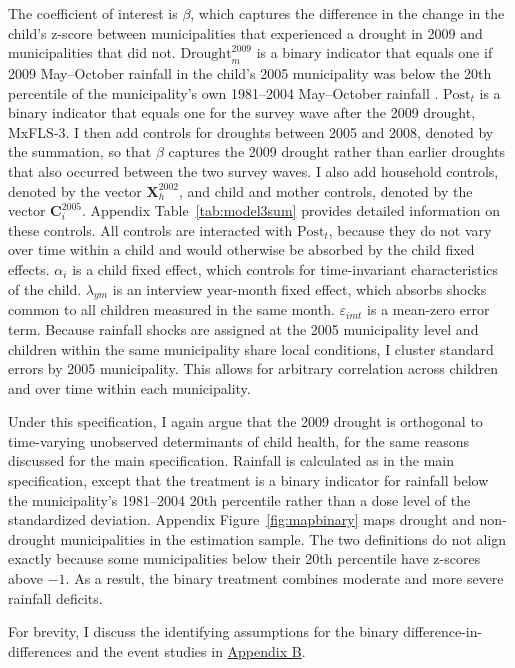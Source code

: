 \documentclass[12pt]{article}
\begin{document}
The coefficient of interest is $\beta$, which captures the difference in the change in the child's z-score between municipalities that experienced a drought in 2009 and municipalities that did not. $\text{Drought}_m^{2009}$ is a binary indicator that equals one if 2009 May--October rainfall in the child's 2005 municipality was below the 20th percentile of the municipality's own 1981--2004 May--October rainfall \parencite{shahDroughtOpportunitiesContemporaneous2017}. $\text{Post}_t$ is a binary indicator that equals one for the survey wave after the 2009 drought, MxFLS-3. I then add controls for droughts between 2005 and 2008, denoted by the summation, so that $\beta$ captures the 2009 drought rather than earlier droughts that also occurred between the two survey waves. I also add household controls, denoted by the vector $\mathbf{X}_h^{2002}$, and child and mother controls, denoted by the vector $\mathbf{C}_i^{2005}$. Appendix Table~\ref{tab:model3sum} provides detailed information on these controls. All controls are interacted with $\text{Post}_t$, because they do not vary over time within a child and would otherwise be absorbed by the child fixed effects. $\alpha_i$ is a child fixed effect, which controls for time-invariant characteristics of the child. $\lambda_{ym}$ is an interview year-month fixed effect, which absorbs shocks common to all children measured in the same month. $\varepsilon_{imt}$ is a mean-zero error term. Because rainfall shocks are assigned at the 2005 municipality level and children within the same municipality share local conditions, I cluster standard errors by 2005 municipality. This allows for arbitrary correlation across children and over time within each municipality.

Under this specification, I again argue that the 2009 drought is orthogonal to time-varying unobserved determinants of child health, for the same reasons discussed for the main specification. Rainfall is calculated as in the main specification, except that the treatment is a binary indicator for rainfall below the municipality's 1981--2004 20th percentile rather than a dose level of the standardized deviation. Appendix Figure~\ref{fig:mapbinary} maps drought and non-drought municipalities in the estimation sample. The two definitions do not align exactly because some municipalities below their 20th percentile have z-scores above $-1$. As a result, the binary treatment combines moderate and more severe rainfall deficits.

For brevity, I discuss the identifying assumptions for the binary difference-in-differences and the event studies in \hyperref[app:binary]{Appendix B}.
\end{document}
